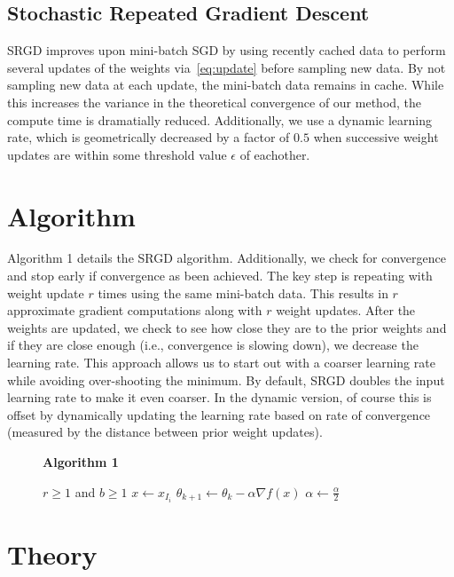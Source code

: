 \documentclass[conference,compsoc]{IEEEtran}
\begin{document}
\subsection{Stochastic Repeated Gradient Descent}
SRGD improves upon mini-batch SGD by using recently cached data to perform
several updates of the weights via~\ref{eq:update} before sampling new data. By
not sampling new data at each update, the mini-batch data remains in cache.
While this increases the variance in the theoretical convergence of our method,
the compute time is dramatially reduced. Additionally, we use a dynamic learning
rate, which is geometrically decreased by a factor of $0.5$ when successive
weight updates are within some threshold value $\epsilon$ of eachother.

\section{Algorithm}
Algorithm 1 details the SRGD algorithm. Additionally, we check for convergence
and stop early if convergence as been achieved. The key step is repeating with
weight update $r$ times using the same mini-batch data. This results in $r$
approximate gradient computations along with $r$ weight updates. After the
weights are updated, we check to see how close they are to the prior weights and
if they are close enough (i.e., convergence is slowing down), we decrease the
learning rate. This approach allows us to start out with a coarser learning rate
while avoiding over-shooting the minimum. By default, SRGD doubles the input
learning rate to make it even coarser. In the dynamic version, of
course this is offset by dynamically updating the learning rate based on
rate of convergence (measured by the distance between prior weight updates).

\begin{figure}
    \textbf{Algorithm 1}
    \label{fig:algorithm}
    \begin{algorithmic}[1]
    \REQUIRE $r \geq 1$ and $b \geq 1$ 
        \STATE $x \gets x_{I_i}$
            \STATE $\theta_{k+1} \gets \theta_k - \alpha \nabla f(x)$
        \ENDFOR
            \STATE $\alpha \gets \frac{\alpha}{2}$
        \ENDIF
    \ENDFOR
    \end{algorithmic}
\end{figure}
\section{Theory}
\end{document}
